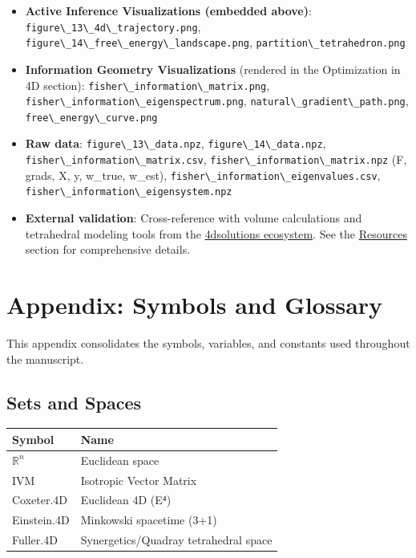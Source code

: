 \documentclass[
  10pt,
]{article}
\newcommand{\passthrough}[1]{#1}
\newcounter{none} %
\providecommand{\tightlist}{%
  \setlength{\itemsep}{0pt}\setlength{\parskip}{0pt}}
\begin{document}
\begin{itemize}
\tightlist
\item
  \textbf{Active Inference Visualizations (embedded above)}:
  \passthrough{\lstinline!figure\_13\_4d\_trajectory.png!},
  \passthrough{\lstinline!figure\_14\_free\_energy\_landscape.png!},
  \passthrough{\lstinline!partition\_tetrahedron.png!}
\item
  \textbf{Information Geometry Visualizations} (rendered in the
  Optimization in 4D section):
  \passthrough{\lstinline!fisher\_information\_matrix.png!},
  \passthrough{\lstinline!fisher\_information\_eigenspectrum.png!},
  \passthrough{\lstinline!natural\_gradient\_path.png!},
  \passthrough{\lstinline!free\_energy\_curve.png!}
\item
  \textbf{Raw data}: \passthrough{\lstinline!figure\_13\_data.npz!},
  \passthrough{\lstinline!figure\_14\_data.npz!},
  \passthrough{\lstinline!fisher\_information\_matrix.csv!},
  \passthrough{\lstinline!fisher\_information\_matrix.npz!} (F, grads,
  X, y, w\_true, w\_est),
  \passthrough{\lstinline!fisher\_information\_eigenvalues.csv!},
  \passthrough{\lstinline!fisher\_information\_eigensystem.npz!}
\item
  \textbf{External validation}: Cross-reference with volume calculations
  and tetrahedral modeling tools from the
  \href{https://github.com/4dsolutions}{4dsolutions ecosystem}. See the
  \href{07_resources.md}{Resources} section for comprehensive details.
\end{itemize}

\newpage

\section{Appendix: Symbols and
Glossary}\label{appendix-symbols-and-glossary}

This appendix consolidates the symbols, variables, and constants used
throughout the manuscript.

\subsection{Sets and Spaces}\label{sets-and-spaces}

{\def\LTcaptype{none} %
\begin{longtable}[]{@{}ll@{}}
\toprule\noalign{}
Symbol & Name \\
\midrule\noalign{}
\endhead
\bottomrule\noalign{}
\endlastfoot
\(\mathbb{R}^n\) & Euclidean space \\
IVM & Isotropic Vector Matrix \\
Coxeter.4D & Euclidean 4D (E⁴) \\
Einstein.4D & Minkowski spacetime (3+1) \\
Fuller.4D & Synergetics/Quadray tetrahedral space \\
\end{longtable}
}
\end{document}
